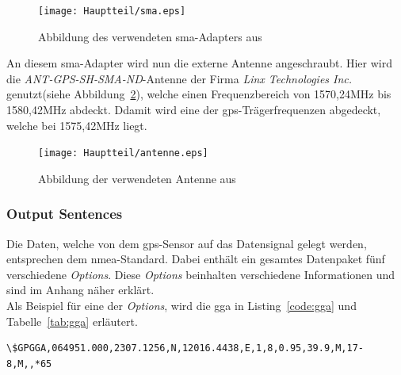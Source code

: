 \begin{figure}[h!]
\centering
\texttt{[image: Hauptteil/sma.eps]}
\caption{Abbildung des verwendeten \ac{sma}-Adapters aus \cite{sma} }
\label{fig:sma}
\end{figure}


An diesem \ac{sma}-Adapter wird nun die externe Antenne angeschraubt. Hier wird die
\emph{ANT-GPS-SH-SMA-ND}-Antenne der Firma \emph{Linx Technologies Inc.}
genutzt(siehe Abbildung~\ref{fig:antenne}), welche einen Frequenzbereich
von 1570,24MHz bis 1580,42MHz abdeckt. Ddamit wird eine der \ac{gps}-Trägerfrequenzen
abgedeckt, welche bei 1575,42MHz liegt.\cite{itwissen}\\

\begin{figure}[h!]
\centering
\texttt{[image: Hauptteil/antenne.eps]}
\caption{Abbildung der verwendeten Antenne aus \cite{antenne} }
\label{fig:antenne}
\end{figure}

\subsubsection{Output Sentences}\label{kap:outputsentences}


Die Daten, welche von dem \ac{gps}-Sensor auf das Datensignal gelegt werden, entsprechen dem \ac{nmea}-Standard.
Dabei enthält ein gesamtes Datenpaket fünf verschiedene \emph{Options}. Diese \emph{Options} beinhalten verschiedene
Informationen und sind im Anhang näher erklärt. \\

\newpage
Als Beispiel für eine der \emph{Options}, wird die \ac{gga} in Listing~\ref{code:gga} und Tabelle~\ref{tab:gga}
erläutert.\cite{pmodgpsman}\\


\begin{lstlisting}[caption={\emph{\ac{nmea}-Message}-Beispiel für \ac{gga} aus \cite{pmodgpsman}},label={code:gga}]
  \$GPGGA,064951.000,2307.1256,N,12016.4438,E,1,8,0.95,39.9,M,17-8,M,,*65
\end{lstlisting}


